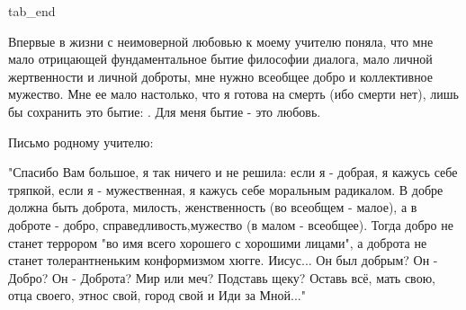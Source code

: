   tab_end
\fi

Впервые в жизни с неимоверной любовью к моему учителю поняла, что мне мало
отрицающей фундаментальное бытие философии диалога, мало личной жертвенности и
личной доброты, мне нужно всеобщее добро и коллективное мужество. Мне ее мало
настолько, что я готова на смерть (ибо смерти нет), лишь бы сохранить это
бытие: . Для меня бытие - это любовь.

Письмо родному учителю:

"Спасибо Вам большое, я так ничего и не решила: если я - добрая, я кажусь себе
тряпкой, если я - мужественная, я кажусь себе  моральным радикалом. В добре
должна быть доброта, милость, женственность (во всеобщем - малое), а в доброте
- добро, справедливость,мужество (в малом - всеобщее). Тогда добро не станет
террором "во имя всего хорошего с хорошими лицами", а доброта не станет
толерантненьким конформизмом хюгге. Иисус... Он был добрым? Он - Добро? Он -
Доброта? Мир или меч? Подставь щеку? Оставь всё, мать свою, отца своего, этнос
свой, город свой и Иди за Мной..."

